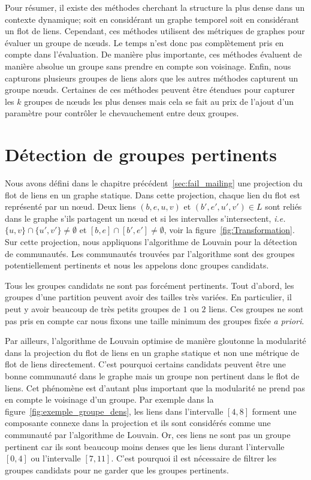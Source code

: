 \bigskip

Pour résumer, il existe des méthodes cherchant la structure la plus dense dans un contexte dynamique; soit en considérant un graphe temporel soit en considérant un flot de liens.
Cependant, ces méthodes utilisent des métriques de graphes pour évaluer un groupe de n\oe{}uds.
Le temps n'est donc pas complètement pris en compte dans l'évaluation.
De manière plus importante, ces méthodes évaluent de manière absolue un groupe sans prendre en compte son voisinage.
Enfin, nous capturons plusieurs groupes de liens alors que les autres méthodes capturent un groupe n\oe{}uds.
Certaines de ces méthodes peuvent être étendues pour capturer les $k$ groupes de n\oe{}uds les plus denses mais cela se fait au prix de l'ajout d'un paramètre pour contrôler le chevauchement entre deux groupes.


\section{Détection de groupes pertinents}
\label{sec:groupe_dense_method}

Nous avons défini dans le chapitre précédent~\ref{sec:fail_mailing} une projection du flot de liens en un graphe statique.
Dans cette projection, chaque lien du flot est représenté par un n\oe{}ud.
Deux liens $(b,e,u,v)$ et $(b',e',u',v') \in L$ sont reliés dans le graphe s'ils partagent un n\oe{}ud et si les intervalles s'intersectent, \emph{i.e.} $\{u,v\} \cap \{u',v'\} \neq \emptyset$ et $[b,e]\cap[b',e'] \neq \emptyset$, voir la figure~\ref{fig:Transformation}.
Sur cette projection, nous appliquons l'algorithme de Louvain pour la détection de communautés.
Les communautés trouvées par l'algorithme sont des groupes potentiellement pertinents et nous les appelons donc groupes candidats.

Tous les groupes candidats ne sont pas forcément pertinents.
Tout d'abord, les groupes d'une partition peuvent avoir des tailles très variées.
En particulier, il peut y avoir beaucoup de très petits groupes de $1$ ou $2$ liens.
Ces groupes ne sont pas pris en compte car nous fixons une taille minimum des groupes fixée \emph{a priori}.

Par ailleurs, l'algorithme de Louvain optimise de manière gloutonne la modularité dans la projection du flot de liens en un graphe statique et non une métrique de flot de liens directement.
C'est pourquoi certains candidats peuvent être une bonne communauté dans le graphe mais un groupe non pertinent dans le flot de liens.
Cet phénomène est d'autant plus important que la modularité ne prend pas en compte le voisinage d'un groupe.
Par exemple dans la figure~\ref{fig:exemple_groupe_dens}, les liens dans l'intervalle $[4,8]$ forment une composante connexe dans la projection et ils sont considérés comme une communauté par l'algorithme de Louvain.
Or, ces liens ne sont pas un groupe pertinent car ils sont beaucoup moins denses que les liens durant l'intervalle $[0,4]$ ou l'intervalle $[7,11]$.
C'est pourquoi il est nécessaire de filtrer les groupes candidats pour ne garder que les groupes pertinents.




